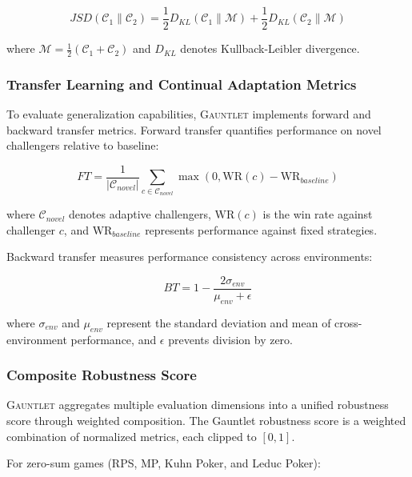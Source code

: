 \documentclass[sigconf,anonymous]{aamas}
\begin{document}
\begin{equation}
JSD(\mathcal{C}_1 \| \mathcal{C}_2) = \frac{1}{2}D_{KL}(\mathcal{C}_1 \| \mathcal{M}) + \frac{1}{2}D_{KL}(\mathcal{C}_2 \| \mathcal{M})
\label{eq:jsd}
\end{equation}

where $\mathcal{M} = \frac{1}{2}(\mathcal{C}_1 + \mathcal{C}_2)$ and $D_{KL}$ denotes Kullback-Leibler divergence.

\subsubsection{Transfer Learning and Continual Adaptation Metrics}

To evaluate generalization capabilities, \textsc{Gauntlet} implements forward and backward transfer metrics. Forward transfer quantifies performance on novel challengers relative to baseline:

\begin{equation}
FT = \frac{1}{|\mathcal{C}_{novel}|} \sum_{c \in \mathcal{C}_{novel}} \max\left(0, \text{WR}(c) - \text{WR}_{baseline}\right)
\label{eq:forward_transfer}
\end{equation}

where $\mathcal{C}_{novel}$ denotes adaptive challengers, $\text{WR}(c)$ is the win rate against challenger $c$, and $\text{WR}_{baseline}$ represents performance against fixed strategies.

Backward transfer measures performance consistency across environments:

\begin{equation}
BT = 1 - \frac{2\sigma_{env}}{\mu_{env} + \epsilon}
\label{eq:backward_transfer}
\end{equation}

where $\sigma_{env}$ and $\mu_{env}$ represent the standard deviation and mean of cross-environment performance, and $\epsilon$ prevents division by zero.

\subsubsection{Composite Robustness Score}

\textsc{Gauntlet} aggregates multiple evaluation dimensions into a unified robustness score through weighted composition. The Gauntlet robustness score is a weighted combination of normalized metrics, each clipped to $[0,1]$.

For zero-sum games (RPS, MP, Kuhn Poker, and Leduc Poker):
\end{document}

